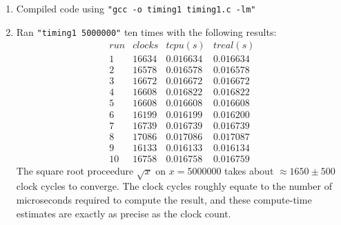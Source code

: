 \documentclass[12pt,fleqn,leqno,letterpaper]{article}
\begin{document}
\begin{enumerate}
    \item Compiled code using \texttt{"gcc -o timing1 timing1.c -lm"}

    \item Ran \texttt{"timing1 5000000"} ten times with the following results:\\
        $$
        \begin{array}{lccc}
            run & clocks & t cpu (s) & t real (s) \\
            1 & 16634 & 0.016634 & 0.016634 \\
            2 & 16578 & 0.016578 & 0.016578 \\
            3 & 16672 & 0.016672 & 0.016672 \\
            4 & 16608 & 0.016822 & 0.016822 \\
            5 & 16608 & 0.016608 & 0.016608 \\
            6 & 16199 & 0.016199 & 0.016200 \\
            7 & 16739 & 0.016739 & 0.016739 \\
            8 & 17086 & 0.017086 & 0.017087 \\
            9 & 16133 & 0.016133 & 0.016134 \\
            10 & 16758 & 0.016758 & 0.016759
        \end{array}
        $$
        The square root proceedure $\sqrt{x}$ on $x=5000000$ takes about
        $\approx1650\pm 500$ clock cycles to converge. The clock cycles roughly
        equate to the number of microseconds required to compute the result, and
        these compute-time estimates are exactly as precise as the clock count.


\end{enumerate}
\end{document}
